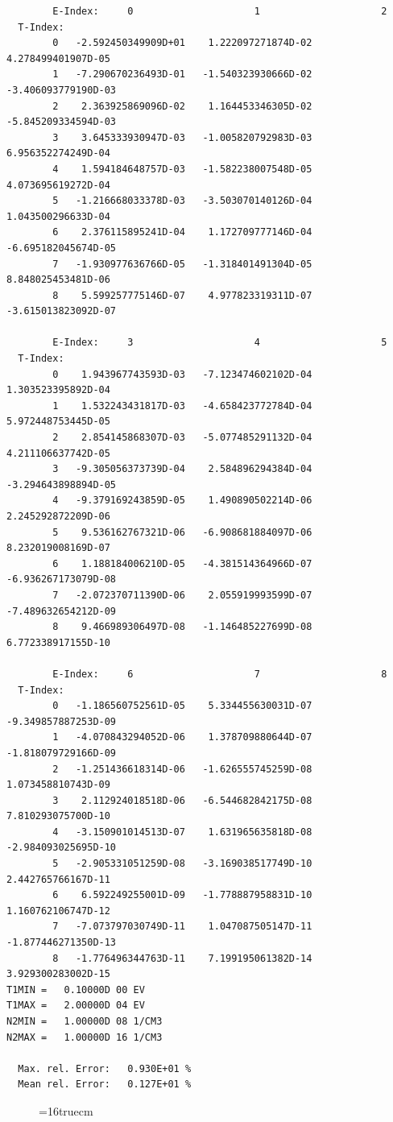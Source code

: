 \documentclass[12pt,dvipdfmx]{article}
\begin{document}
\begin{small}\begin{verbatim}
        E-Index:     0                     1                     2
  T-Index:
        0   -2.592450349909D+01    1.222097271874D-02    4.278499401907D-05
        1   -7.290670236493D-01   -1.540323930666D-02   -3.406093779190D-03
        2    2.363925869096D-02    1.164453346305D-02   -5.845209334594D-03
        3    3.645333930947D-03   -1.005820792983D-03    6.956352274249D-04
        4    1.594184648757D-03   -1.582238007548D-05    4.073695619272D-04
        5   -1.216668033378D-03   -3.503070140126D-04    1.043500296633D-04
        6    2.376115895241D-04    1.172709777146D-04   -6.695182045674D-05
        7   -1.930977636766D-05   -1.318401491304D-05    8.848025453481D-06
        8    5.599257775146D-07    4.977823319311D-07   -3.615013823092D-07

        E-Index:     3                     4                     5
  T-Index:
        0    1.943967743593D-03   -7.123474602102D-04    1.303523395892D-04
        1    1.532243431817D-03   -4.658423772784D-04    5.972448753445D-05
        2    2.854145868307D-03   -5.077485291132D-04    4.211106637742D-05
        3   -9.305056373739D-04    2.584896294384D-04   -3.294643898894D-05
        4   -9.379169243859D-05    1.490890502214D-06    2.245292872209D-06
        5    9.536162767321D-06   -6.908681884097D-06    8.232019008169D-07
        6    1.188184006210D-05   -4.381514364966D-07   -6.936267173079D-08
        7   -2.072370711390D-06    2.055919993599D-07   -7.489632654212D-09
        8    9.466989306497D-08   -1.146485227699D-08    6.772338917155D-10

        E-Index:     6                     7                     8
  T-Index:
        0   -1.186560752561D-05    5.334455630031D-07   -9.349857887253D-09
        1   -4.070843294052D-06    1.378709880644D-07   -1.818079729166D-09
        2   -1.251436618314D-06   -1.626555745259D-08    1.073458810743D-09
        3    2.112924018518D-06   -6.544682842175D-08    7.810293075700D-10
        4   -3.150901014513D-07    1.631965635818D-08   -2.984093025695D-10
        5   -2.905331051259D-08   -3.169038517749D-10    2.442765766167D-11
        6    6.592249255001D-09   -1.778887958831D-10    1.160762106747D-12
        7   -7.073797030749D-11    1.047087505147D-11   -1.877446271350D-13
        8   -1.776496344763D-11    7.199195061382D-14    3.929300283002D-15
T1MIN =   0.10000D 00 EV
T1MAX =   2.00000D 04 EV
N2MIN =   1.00000D 08 1/CM3
N2MAX =   1.00000D 16 1/CM3

  Max. rel. Error:   0.930E+01 %
  Mean rel. Error:   0.127E+01 %
\end{verbatim}\end{small}
\begin{figure} \label{2.1.8r}
\epsfxsize=16truecm
\end{figure}
\newpage
\end{document}
